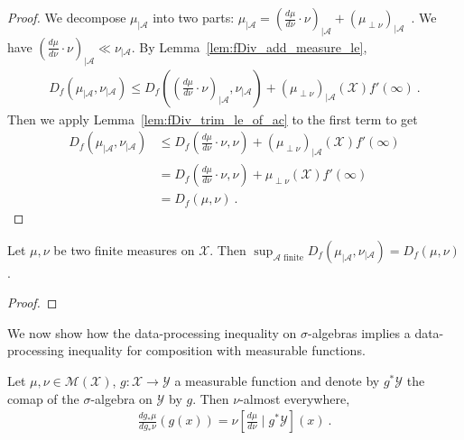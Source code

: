 \begin{proof}\leanok
{}
We decompose $\mu_{| \mathcal A}$ into two parts: $\mu_{| \mathcal A} = (\frac{d\mu}{d\nu}\cdot \nu)_{| \mathcal A} + (\mu_{\perp \nu})_{| \mathcal A}$~. 
We have $(\frac{d\mu}{d\nu}\cdot \nu)_{| \mathcal A} \ll \nu_{| \mathcal A}$.
By Lemma~\ref{lem:fDiv_add_measure_le},
\begin{align*}
D_f(\mu_{| \mathcal A}, \nu_{| \mathcal A})
\le D_f\left((\frac{d\mu}{d\nu}\cdot \nu)_{| \mathcal A}, \nu_{| \mathcal A}\right)
  + (\mu_{\perp \nu})_{| \mathcal A}(\mathcal X) f'(\infty)
\: .
\end{align*}
Then we apply Lemma~\ref{lem:fDiv_trim_le_of_ac} to the first term to get
\begin{align*}
D_f(\mu_{| \mathcal A}, \nu_{| \mathcal A})
&\le D_f\left(\frac{d\mu}{d\nu}\cdot \nu, \nu\right)
  + (\mu_{\perp \nu})_{| \mathcal A}(\mathcal X) f'(\infty)
\\
&= D_f\left(\frac{d\mu}{d\nu}\cdot \nu, \nu\right)
  + \mu_{\perp \nu}(\mathcal X) f'(\infty)
\\
&= D_f(\mu, \nu)
\: .
\end{align*}
\end{proof}


\begin{theorem}
  \label{thm:iSup_fDiv_trim}
  Let $\mu, \nu$ be two finite measures on $\mathcal X$. Then
  $\sup_{\mathcal A \text{ finite}} D_f(\mu_{| \mathcal A}, \nu_{| \mathcal A}) = D_f(\mu, \nu)$.
\end{theorem}

\begin{proof}
\end{proof}


We now show how the data-processing inequality on $\sigma$-algebras implies a data-processing inequality for composition with measurable functions.

\begin{lemma}
  \label{lem:rnDeriv_map_eq_condexp}
  \uses{}
  Let $\mu, \nu \in \mathcal M(\mathcal X)$, $g : \mathcal X \to \mathcal Y$ a measurable function and denote by $g^* \mathcal Y$ the comap of the $\sigma$-algebra on $\mathcal Y$ by $g$.
  Then $\nu$-almost everywhere,
  \begin{align*}
  \frac{d g_*\mu}{d g_*\nu}(g(x)) = \nu\left[ \frac{d \mu}{d \nu} \mid g^* \mathcal Y\right](x)
  \: .
  \end{align*}
\end{lemma}

